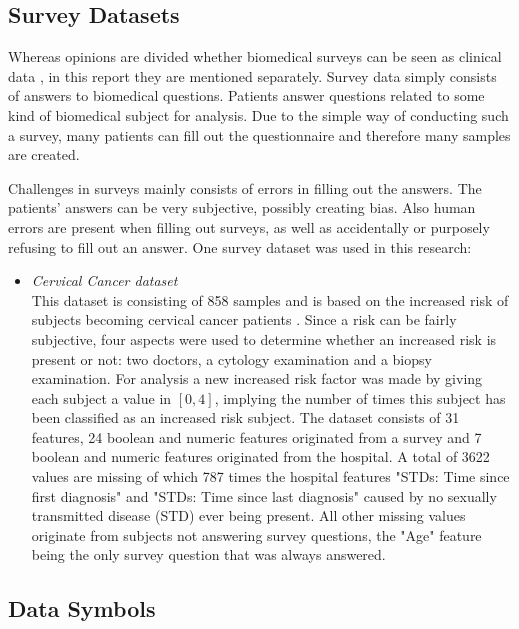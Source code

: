 \documentclass[10pt,a4paper]{report}
\begin{document}
	\subsection{Survey Datasets}
	\label{PLsubsec:Survey}
	
	Whereas opinions are divided whether biomedical surveys can be seen as clinical data \cite{misery2011sensitive}, in this report they are mentioned separately. Survey data simply consists of answers to biomedical questions. Patients answer questions related to some kind of biomedical subject for analysis. Due to the simple way of conducting such a survey, many patients can fill out the questionnaire and therefore many samples are created.
	
	Challenges in surveys mainly consists of errors in filling out the answers. The patients' answers can be very subjective, possibly creating bias. Also human errors are present when filling out surveys, as well as accidentally or purposely refusing to fill out an answer. One survey dataset was used in this research:
	
	\begin{itemize}
		\item \textit{Cervical Cancer dataset} \\ This dataset is consisting of 858 samples and is based on the increased risk of subjects becoming cervical cancer patients \cite{fernandes2017transfer}. Since a risk can be fairly subjective, four aspects were used to determine whether an increased risk is present or not: two doctors, a cytology examination and a biopsy examination. For analysis a new increased risk factor was made by giving each subject a value in $[0, 4]$, implying the number of times this subject has been classified as an increased risk subject. The dataset consists of 31 features, 24 boolean and numeric features originated from a survey and 7 boolean and numeric features originated from the hospital. A total of 3622 values are missing of which 787 times the hospital features "STDs: Time since first diagnosis" and "STDs: Time since last diagnosis" caused by no sexually transmitted disease (STD) ever being present. All other missing values originate from subjects not answering survey questions, the "Age" feature being the only survey question that was always answered.
	\end{itemize}
	
	\subsection{Data Symbols}
	\label{subsec:DataSymbols}
	
\end{document}

